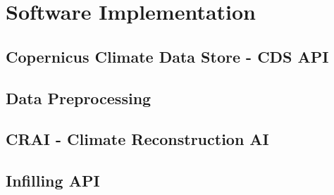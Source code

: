 \section{Software Implementation}
\label{sec:implementation}

\subsection{Copernicus Climate Data Store - CDS API}

\subsection{Data Preprocessing}

\subsection{CRAI - Climate Reconstruction AI}

\subsection{Infilling API}